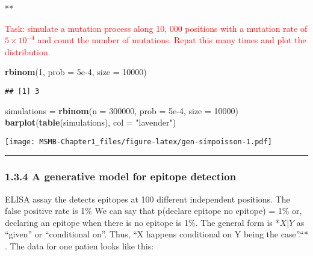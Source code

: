 \documentclass[]{article}
\newenvironment{Shaded}{\begin{snugshade}}{\end{snugshade}}
\newcommand{\KeywordTok}[1]{\textcolor[rgb]{0.13,0.29,0.53}{\textbf{#1}}}
\newcommand{\DataTypeTok}[1]{\textcolor[rgb]{0.13,0.29,0.53}{#1}}
\newcommand{\DecValTok}[1]{\textcolor[rgb]{0.00,0.00,0.81}{#1}}
\newcommand{\FloatTok}[1]{\textcolor[rgb]{0.00,0.00,0.81}{#1}}
\newcommand{\StringTok}[1]{\textcolor[rgb]{0.31,0.60,0.02}{#1}}
\newcommand{\NormalTok}[1]{#1}
\let\origfigure\figure
\let\endorigfigure\endfigure
\renewenvironment{figure}[1][2] {
    \expandafter\origfigure\expandafter[H]
} {
    \endorigfigure
}
\let\oldrule=\rule
\renewcommand{\rule}[1]{\oldrule{\linewidth}}
\begin{document}
**

\textcolor{red}{Task: simulate a mutation process along 10, 000 positions with a mutation rate of $5\times10^{-4}$ and count the number of mutations. Repat this many times and plot the distribution.}

\begin{Shaded}
\begin{Highlighting}[]
\KeywordTok{rbinom}\NormalTok{(}\DecValTok{1}\NormalTok{, }\DataTypeTok{prob =} \FloatTok{5e-4}\NormalTok{, }\DataTypeTok{size =} \DecValTok{10000}\NormalTok{)}
\end{Highlighting}
\end{Shaded}

\begin{verbatim}
## [1] 3
\end{verbatim}

\begin{Shaded}
\begin{Highlighting}[]
\NormalTok{simulations =}\StringTok{ }\KeywordTok{rbinom}\NormalTok{(}\DataTypeTok{n =} \DecValTok{300000}\NormalTok{, }\DataTypeTok{prob =} \FloatTok{5e-4}\NormalTok{, }\DataTypeTok{size =} \DecValTok{10000}\NormalTok{)}
\KeywordTok{barplot}\NormalTok{(}\KeywordTok{table}\NormalTok{(simulations), }\DataTypeTok{col =} \StringTok{"lavender"}\NormalTok{)}
\end{Highlighting}
\end{Shaded}

\begin{figure}
\centering
\texttt{[image: MSMB-Chapter1\_files/figure-latex/gen-simpoisson-1.pdf]}
\caption{Simulated distribution of B(10000, \(10^{-4}\)) for
(ref:gen-simpoisson-1) simulations.}
\end{figure}

\begin{center}\rule{0.5\linewidth}{\linethickness}\end{center}

\subsubsection{1.3.4 A generative model for epitope
detection}\label{a-generative-model-for-epitope-detection}

ELISA assay the detects epitopes at 100 different independent positions.
The false positive rate is 1\% We can say that p(declare epitope
\textbar{} no epitope) = 1\% or, declaring an epitope when there is no
epitope is 1\%. The general form is *\(X|Y\) as ``given'' or
``conditional on''. Thus, ``X happens conditional on Y being the
case''.``* . The data for one patien looks like this:
\end{document}
